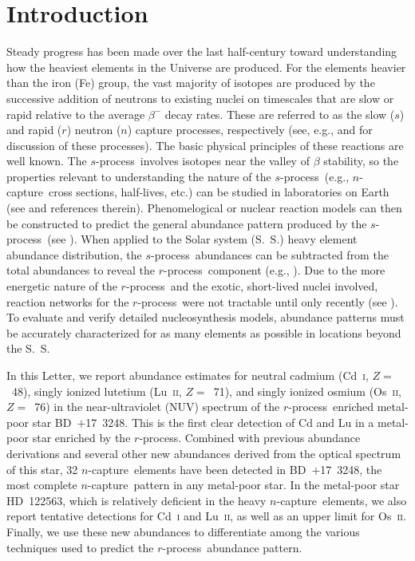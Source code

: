 \documentclass{emulateapj}
\def\bd{\mbox{BD~$+$17~3248}}
\def\hd{\mbox{HD~122563}}
\def\rpro{\mbox{$r$-process}}
\def\spro{\mbox{$s$-process}}
\def\ncap{\mbox{$n$-capture}}
\begin{document}


\section{Introduction}
\label{intro}


Steady progress has been made over the last half-century
toward understanding how the heaviest elements
in the Universe are produced.
For the elements heavier than the iron (Fe) group, the vast majority
of isotopes are produced by the successive addition of neutrons
to existing nuclei on timescales that are slow or rapid
relative to the average $\beta^{-}$ decay rates.
These are referred to as the slow ($s$) and rapid ($r$) neutron ($n$)
capture processes, respectively
(see, e.g., \citealt{truran02} and \citealt{sneden08} for 
discussion of these processes).
The basic physical principles of these reactions are well known.
The \spro\ involves isotopes near the valley of
$\beta$ stability, so the properties relevant to understanding 
the nature of the \spro\ 
(e.g., \ncap\ cross sections, half-lives, etc.) can be studied 
in laboratories on Earth (see \citealt{cowan91} and references therein).
Phenomelogical or 
nuclear reaction models can then be constructed
to predict the general abundance pattern produced by the \spro\
(see \citealt{busso99}).
When applied to the Solar system (S.~S.) heavy element abundance distribution,
the \spro\ abundances can be subtracted
from the total abundances to reveal the \rpro\ 
component (e.g., \citealt{seeger65,kappeler89,arlandini99}).
Due to the more energetic nature of the \rpro\ and the exotic, 
short-lived nuclei involved, reaction networks for the
\rpro\ were not tractable until only recently
(see \citealt{kratz07}).
To evaluate and verify detailed nucleosynthesis models,
abundance patterns must be accurately characterized for 
as many elements as possible in locations beyond the S.~S.

In this Letter, we report abundance estimates for 
neutral cadmium (Cd~\textsc{i}, $Z =$~48), 
singly ionized lutetium (Lu~\textsc{ii}, $Z =$~71), 
and singly ionized osmium (Os~\textsc{ii}, $Z =$~76)
in the near-ultraviolet (NUV) 
spectrum of the \rpro\ enriched metal-poor star \bd.
This is the first clear detection of Cd and Lu in 
a metal-poor star enriched by the \rpro.
Combined with previous abundance derivations \citep{cowan02,cowan05,sneden09}
and several other new abundances derived from the optical spectrum
of this star,
32 \ncap\ elements have been detected in \bd,
the most complete \ncap\ pattern in any metal-poor star.
In the metal-poor star \hd, which
is relatively deficient in the heavy \ncap\ elements,
we also report tentative detections for Cd~\textsc{i} 
and Lu~\textsc{ii}, as well as an upper limit for Os~\textsc{ii}.
Finally, we use these new abundances to differentiate among the
various techniques used to predict the \rpro\ abundance pattern.
\end{document}
